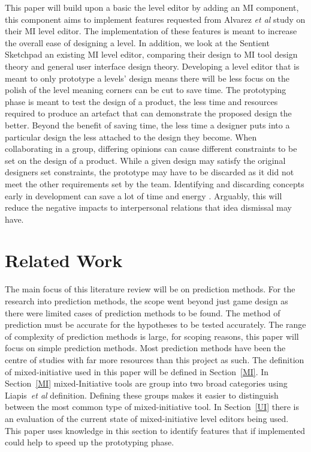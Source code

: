 \documentclass[journal]{IEEEtran}
\begin{document}
This paper will build upon a basic the level editor by adding an MI component, this component aims to implement features requested from Alvarez \textit{et al}\cite{alvarez2018fostering} study on their MI level editor. The implementation of these features is meant to increase the overall ease of designing a level. In addition, we look at the Sentient Sketchpad\cite{liapis2013sentient} an existing MI level editor, comparing their design to MI tool design theory and general user interface design theory. Developing a level editor that is meant to only prototype a levels' design means there will be less focus on the polish of the level meaning corners can be cut to save time.  The prototyping phase is meant to test the design of a product, the less time and resources required to produce an artefact that can demonstrate the proposed design the better. Beyond the benefit of saving time, the less time a designer puts into a particular design the less attached to the design they become. When collaborating in a group, differing opinions can cause different constraints to be set on the design of a product. While a given design may satisfy the original designers set constraints, the prototype may have to be discarded as it did not meet the other requirements set by the team. Identifying and discarding concepts early in development can save a lot of time and energy \cite[p.489]{stempfle1999thinking}. Arguably, this will reduce the negative impacts to interpersonal relations that idea dismissal may have. 

\section{Related Work}
The main focus of this literature review will be on prediction methods. For the research into prediction methods, the scope went beyond just game design as there were limited cases of prediction methods to be found. The method of prediction must be accurate for the hypotheses to be tested accurately.  The range of complexity of prediction methods is large, for scoping reasons, this paper will focus on simple prediction methods. Most prediction methods have been the centre of studies with far more resources than this project as such.  The definition of mixed-initiative used in this paper will be defined in  Section~\ref{MI}.  In Section~\ref{MI} mixed-Initiative tools are group into two broad categories using Liapis~\textit{et al}\cite{liapis2016mixed} definition. Defining these groups makes it easier to distinguish between the most common type of mixed-initiative tool.  In Section~\ref{UI} there is an evaluation of the current state of mixed-initiative level editors being used.  This paper uses knowledge in this section to identify features that if implemented could help to speed up the prototyping phase. 
\end{document}

